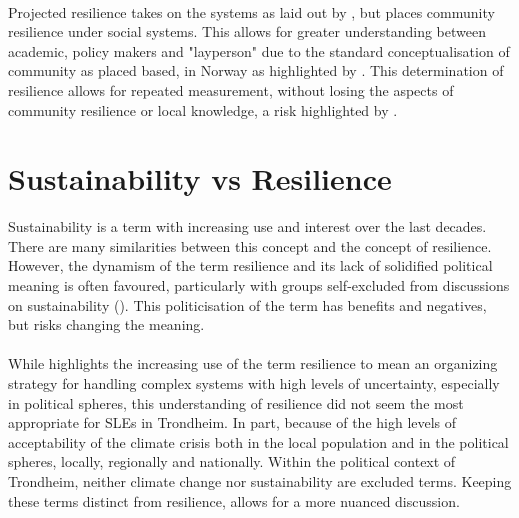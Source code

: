 \paragraph{}

Projected resilience takes on the systems as laid out by \cite{cutter_community_2020}, but places community resilience under social systems. This allows for greater understanding between academic, policy makers and "layperson" due to the standard conceptualisation of community as placed based, in Norway as highlighted by \cite{rasanen_conceptualizing_2020}. This determination of resilience allows for repeated measurement, without losing the aspects of community resilience or local knowledge, a risk highlighted by \cite{rasanen_conceptualizing_2020}.



\section{Sustainability vs Resilience}

Sustainability is a term with increasing use and interest over the last decades. There are many similarities between this concept and the concept of resilience. However, the dynamism of the term resilience and its lack of solidified political meaning is often favoured, particularly with groups self-excluded from discussions on sustainability (\cite{moser_turbulent_2019}). This politicisation of the term has benefits and negatives, but risks changing the meaning.
\paragraph{}

While \cite{moser_turbulent_2019} highlights the increasing use of the term resilience to mean an organizing strategy for handling complex systems with high levels of uncertainty, especially in political spheres, this understanding of resilience did not seem the most appropriate for SLEs in Trondheim. In part, because of the high levels of acceptability of the climate crisis both in the local population and in the political spheres, locally, regionally and nationally. Within the political context of Trondheim, neither climate change nor sustainability are excluded terms. Keeping these terms distinct from resilience, allows for a more nuanced discussion.







